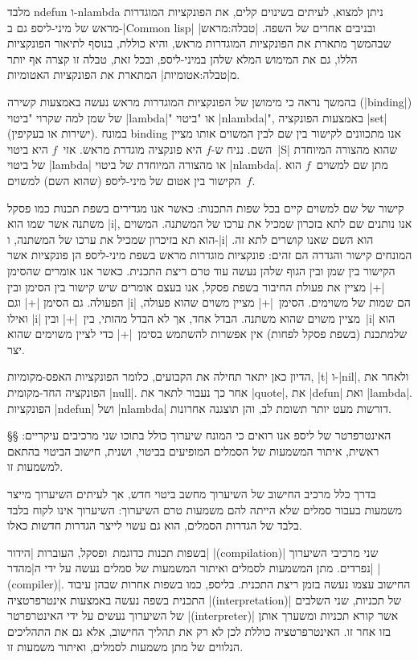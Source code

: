 מלבד ndefun ו-nlambda ניתן למצוא, לעיתים בשינוים קלים, את הפונקציות המוגדרות
מראש של מיני-ליספ גם ב-\E|Common lisp| ובניבים אחרים של השפה.
|טבלה:מראש| שבהמשך מתארת את הפונקציות המוגדרות מראש, והיא כוללת, בנוסף
לתיאור הפונקציות הללו, גם את המימוש המלא שלהן במיני-ליספ, ובכל זאת, טבלה זו
קצרה אף יותר מ|טבלה:אטומיות| המתארת את הפונקציות האטומיות.

בהמשך נראה כי מימושן של הפונקציות המוגדרות מראש נעשה באמצעות קשירה
(\E|binding|) של שמן למה שקרוי "ביטוי \E|lambda|" או "ביטוי \E|nlambda|",
באמצעות הפונקציה \E|set| (ישירות או בעקיפין). במונח binding אנו מתכוונים לקישור
בין שם לבין המשוים אותו מציין השם. נניח ש-$f$ היא פונקציה מוגדרת מראש. אזי~$f$
היא ביטוי~\E|S| שהוא מהצורה המיוחדת של ביטוי \E|lambda| או מהצורה המיוחדת של
ביטוי \E|nlambda|. מתן שם למשוים~$f$ הוא הקישור בין אטום של מיני-ליספ (שהוא
השם) למשוים~$f$.

קישור של שם למשוים קיים בכל שפות התכנות: כאשר אנו מגדירים בשפת תכנות כמו פסקל
משתנה אשר שמו הוא \T|i|, אנו נותנים שם לתא בזכרון שמכיל את ערכו של המשתנה.
המשוים הוא תא בזיכרון שמכיל את ערכו של המשתנה, ו-\T|i| הוא השם שאנו קושרים לתא
זה. המונחים קישור והגדרה הם זהים: פונקציות מוגדרות מראש בשפת מיני-ליספ הן
פונקציות אשר הקישור בין שמן ובין הגוף שלהן נעשה עוד טרם ריצת התכנית. כאשר אנו
אומרים שהסימן \T|+| מציין את פעולת החיבור בשפת פסקל, אנו בעצם אומרים שיש קישור
בין הסימן ובין הפעולה. גם הסימן \T|+| וגם \T|i| הם שמות של משוימים. הסימן~\T|+|
מציין משוים שהוא פעולה, ואילו \T|i| מציין משוים שהוא משתנה. הבדל אחד, אך לא
הבדל מהותי, בין~\T|+| ובין~\T|i| הוא שלמתכנת (בשפת פסקל לפחות) אין אפשרות
להשתמש בסימן~\T|+| כדי לציין משוימים שהוא יצר.

הדיון כאן יתאר תחילה את הקבועים, כלומר הפונקציות האפס-מקומיות, \E|t| ו-\E|nil|,
ולאחר את הפונקציה החד-מקומית \E|null|. אחר כך נעבור לתאר את \E|quote|, את
\E|defun| ואת \E|lambda|. הפונקציות \E|ndefun| ושל \E|nlambda| דורשות מעט יותר
תשומת לב, והן תוצגנה אחרונות.

§§ האינטרפרטר של ליספ
אנו רואים כי המונח שיערוך כולל בתוכו שני מרכיבים עיקריים: ראשית, איתור המשמעות
של הסמלים המופיעים בביטוי, ושנית, חישוב הביטוי בהתאם למשמעות זו.

בדרך כלל מרכיב החישוב של השיערוך מחשב ביטוי חדש, אך לעיתים השיערוך מייצר משמעות
בעבור סמלים שלא הייתה להם משמעות טרם השיערוך: השיערוך אינו לקוח בלבד
בלבד של הגדרות הסמלים, הוא גם עשוי לייצר הגדרות חדשות כאלו.

בשפות תכנות כדוגמת~\CPL ופסקל, העוברות \ע|הידור| \E|(compilation)| שני מרכיבי
השיערוך נפרדים. מתן המשמעות לסמלים ואיתור המשמעות של סמלים נעשה על ידי
ה\ע|מהדר| \E|(compiler)|. החישוב עצמו נעשה בזמן ריצת התכנית. בליספ, כמו בשפות
אחרות שבהן עיבוד התכנית בשפה נעשה באמצעות אינטרפרטציה \E|(interpretation)| של
תכניות, שני השלבים של השיערוך נעשים על ידי האינטרפרטר \E|(interpreter)| אשר
קורא תכניות ומשערך אותן בזו אחר זו. האינטרפרטציה כוללת לכן לא רק את תהליך
החישוב, אלא גם את התהליכים הנלווים של מתן משמעות לסמלים, ואיתור משמעות זו.

